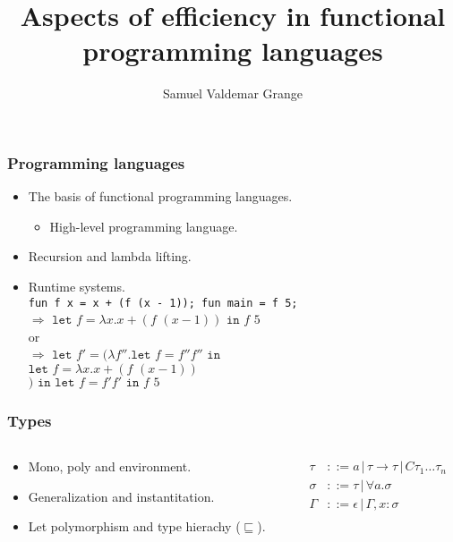 \documentclass{beamer}
\title{Aspects of efficiency in functional programming languages}
\author{Samuel Valdemar Grange}
\institute{Department of Mathematics and Computer Science (IMADA)}
\date{}
\begin{document}
\frame{\titlepage}

\begin{frame}
\frametitle{Programming languages}
\begin{itemize}
    \item The basis of functional programming languages.
    \begin{itemize}
        \item High-level programming language.
    \end{itemize}
    \item Recursion and lambda lifting.
    \item Runtime systems.\\
    \texttt{fun f x = x + (f (x - 1)); fun main = f 5;}\\
    $\Rightarrow$ $\texttt{let } f = \lambda x.x + (\textit{f } (x - 1)) \texttt{ in } \textit{f } 5$
    \\or\\
    $\Rightarrow$ $\texttt{let } f' = (\lambda f''. \texttt{let } f = f'' f'' \texttt{ in }$\\
    \hspace*{1cm}$\texttt{let } f = \lambda x.x + (\textit{f } (x - 1))$\\
    $) \texttt{ in } \texttt{let } f = f' f' \texttt{ in } \textit{f } 5$
\end{itemize}
\end{frame}

\begin{frame}
\frametitle{Types}
\begin{columns}
    \begin{column}{0.6\textwidth}
        \begin{itemize}
            \item Mono, poly and environment.
            \item Generalization and instantitation.
            \item Let polymorphism and type hierachy ($\sqsubseteq$).
        \end{itemize}
    \end{column}
    
    \begin{column}{0.4\textwidth}
        \begin{align}
        \tau &::= a \,|\, \tau \rightarrow \tau \,|\, C\tau_1 \dots \tau_n \tag*{}\\
        \sigma &::= \tau \,|\, \forall a.\sigma \tag*{}\\
        \Gamma &::= \epsilon \,|\, \Gamma, x: \sigma \tag*{}
        \end{align}
    \end{column}
\end{columns}
\end{frame}
\end{document}
